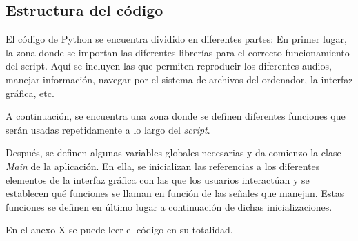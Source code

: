 \documentclass[11pt,a4paper,twoside]{book}
\begin{document}
            \subsection{Estructura del código}
                El código de Python se encuentra dividido en diferentes partes:
                En primer lugar, la zona donde se importan las diferentes librerías para el correcto funcionamiento del script. Aquí se incluyen las que permiten reproducir los diferentes audios, manejar información, navegar por el sistema de archivos del ordenador, la interfaz gráfica, etc.
                
                A continuación, se encuentra una zona donde se definen diferentes funciones que serán usadas repetidamente a lo largo del \textit{script}. 
                
                Después, se definen algunas variables globales necesarias y da comienzo la clase \textit{Main} de la aplicación. En ella, se inicializan las referencias a los diferentes elementos de la interfaz gráfica con las que los usuarios interactúan y se establecen qué funciones se llaman en función de las señales que manejan. Estas funciones se definen en último lugar a continuación de dichas inicializaciones.
                
                En el anexo X se puede leer el código en su totalidad.
               
        


\end{document}
